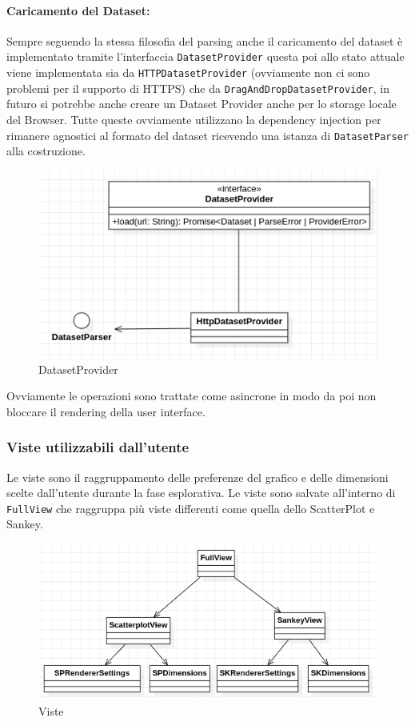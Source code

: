 \paragraph{Caricamento del Dataset:}
Sempre seguendo la stessa filosofia del parsing anche il caricamento del dataset
è implementato tramite l'interfaccia \texttt{DatasetProvider} questa poi allo stato
attuale viene implementata sia da \texttt{HTTPDatasetProvider} (ovviamente non ci
sono problemi per il supporto di HTTPS) che da \texttt{DragAndDropDatasetProvider}, in
futuro si potrebbe anche creare un Dataset Provider anche per lo storage locale del
Browser. Tutte queste ovviamente utilizzano la dependency injection per rimanere
agnostici al formato del dataset ricevendo una istanza di \texttt{DatasetParser}
alla costruzione.
\begin{figure}[h!]
  \centering
  \includegraphics[scale=0.55]{../../assets/classi_uml/datasetprovider.png}
  \caption{DatasetProvider}
\end{figure}
Ovviamente le operazioni sono trattate come asincrone in modo da poi non
bloccare il rendering della user interface.

\subsubsection{Viste utilizzabili dall'utente}
Le viste sono il raggruppamento delle preferenze del grafico e delle dimensioni
scelte dall'utente durante la fase esplorativa. Le viste sono salvate all'interno
di \texttt{FullView} che raggruppa più viste differenti come quella dello
ScatterPlot e Sankey.
\begin{figure}[h!]
  \centering
  \includegraphics[scale=0.55]{../../assets/classi_uml/vister.png}
  \caption{Viste}
\end{figure}

